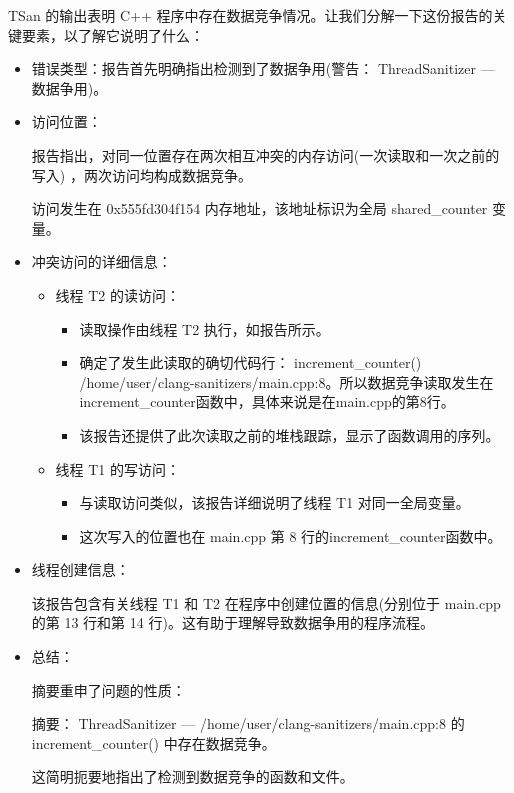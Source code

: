TSan 的输出表明 C++ 程序中存在数据竞争情况。让我们分解一下这份报告的关键要素，以了解它说明了什么：

\begin{itemize}
\item
错误类型：报告首先明确指出检测到了数据争用(警告： ThreadSanitizer --- 数据争用)。

\item
访问位置：

报告指出，对同一位置存在两次相互冲突的内存访问(一次读取和一次之前的写入) ，两次访问均构成数据竞争。


访问发生在 0x555fd304f154 内存地址，该地址标识为全局 shared\_counter 变量。

\item
冲突访问的详细信息：

\begin{itemize}
\item
线程 T2 的读访问：

\begin{itemize}
\item
读取操作由线程 T2 执行，如报告所示。

\item
确定了发生此读取的确切代码行： increment\_counter() /home/user/clang-sanitizers/main.cpp:8。所以数据竞争读取发生在increment\_counter函数中，具体来说是在main.cpp的第8行。

\item
该报告还提供了此次读取之前的堆栈跟踪，显示了函数调用的序列。
\end{itemize}

\item
线程 T1 的写访问：
\begin{itemize}
\item
与读取访问类似，该报告详细说明了线程 T1 对同一全局变量。

\item
这次写入的位置也在 main.cpp 第 8 行的increment\_counter函数中。
\end{itemize}
\end{itemize}

\item
线程创建信息：

该报告包含有关线程 T1 和 T2 在程序中创建位置的信息(分别位于 main.cpp 的第 13 行和第 14 行)。这有助于理解导致数据争用的程序流程。

\item
总结：

摘要重申了问题的性质：

摘要： ThreadSanitizer --- /home/user/clang-sanitizers/main.cpp:8 的 increment\_counter() 中存在数据竞争。

这简明扼要地指出了检测到数据竞争的函数和文件。
\end{itemize}

